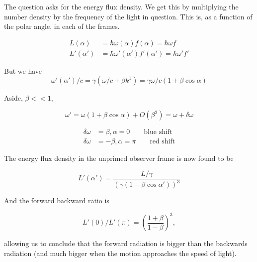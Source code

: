 The question asks for the energy flux density.  We get this by multiplying the number density by the frequency of the light in question.  This is, as a function of the polar angle, in each of the frames.

\begin{align}\label{eqn:relativisticElectrodynamicsT1:210}
L(\alpha) &= \hbar \omega(\alpha) f(\alpha) = \hbar \omega f \\
L'(\alpha') &= \hbar \omega'(\alpha') f'(\alpha') = \hbar \omega' f'
\end{align}

But we have
\begin{equation}\label{eqn:relativisticElectrodynamicsT1:220}
\omega'(\alpha')/c = \gamma( \omega/c + \beta k^1 ) = \gamma \omega/c ( 1 + \beta \cos\alpha )
\end{equation}

Aside, $\beta << 1$, 

\begin{equation}\label{eqn:relativisticElectrodynamicsT1:230}
\omega' = \omega ( 1 + \beta \cos\alpha) + O(\beta^2) = \omega + \delta \omega
\end{equation}

\begin{align}\label{eqn:relativisticElectrodynamicsT1:240}
\delta \omega &= \beta, \alpha = 0 		\qquad \text{blue shift} \\
\delta \omega &= -\beta, \alpha = \pi 		\qquad \text{red shift}
\end{align}

The energy flux density in the unprimed observer frame is now found to be

\begin{equation}\label{eqn:relativisticElectrodynamicsT1:241}
L'(\alpha') = \frac{L/\gamma}{(\gamma (1 - \beta \cos\alpha'))^3}
\end{equation}

And the forward backward ratio is

\begin{equation}\label{eqn:relativisticElectrodynamicsT1:250}
L'(0)/L'(\pi) = {\left( \frac{ 1 + \beta }{1-\beta} \right)}^3,
\end{equation}

allowing us to conclude that the forward radiation is bigger than the backwards radiation (and much bigger when the motion approaches the speed of light).

\EndArticle
